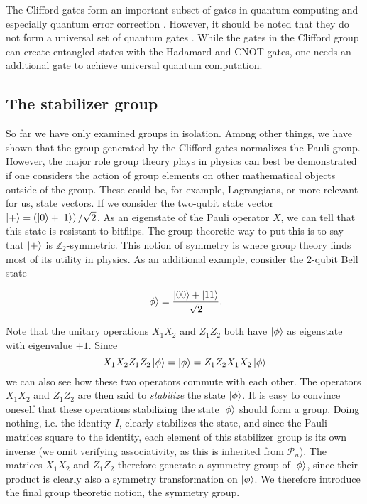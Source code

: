 The Clifford gates form an important subset of gates in quantum computing and
especially quantum error correction
\cite{calderbankQuantumErrorCorrection1997,calderbankGoodQuantumErrorcorrecting1996,steaneMultipleParticleInterferenceQuantum1996,bennettQuantumCryptographyPublic2020,bennettCommunicationOneTwoparticle1992}.
However, it should be noted that they do not form a universal set
of quantum gates . While the gates in the Clifford group can create entangled
states with the Hadamard and CNOT gates, one needs an additional gate to
achieve universal quantum computation.
\subsection{The stabilizer group}

So far we have only examined groups in isolation. Among other things, we have
shown that the group generated by the Clifford gates normalizes the Pauli
group.  However, the major role group theory plays in physics can best be
demonstrated if one considers the action of group elements on other
mathematical objects outside of the group. These could be, for example,
Lagrangians, or more relevant for us, state vectors. If we consider the
two-qubit state vector $\ket{+} = \left( \ket{0} + \ket{1} \right) / \sqrt{2}$.
As an eigenstate of the Pauli operator $X$, we can tell that this state is
resistant to bitflips.  The group-theoretic way to put this is to say that
$\ket{+}$ is $\mathbb{Z}_2$-symmetric. This notion of symmetry is where group
theory finds most of its utility in physics.  As an additional example,
consider the 2-qubit Bell state

\begin{align}
  \ket{\phi} = \frac{\ket{00} + \ket{11}}{\sqrt{2}} 
.\end{align}

Note that the unitary operations $X_1 X_2$ and $Z_1 Z_2$ both have $\ket{\phi}$
as eigenstate with eigenvalue $+1$. Since $$X_1X_2Z_1Z_2\ket{\phi} = \ket{\phi} =
Z_1Z_2X_1X_2\ket{\phi}$$ we can also see how these two operators commute with each
other. The operators $X_1X_2$ and $Z_1Z_2$ are then said to \emph{stabilize} the
state $\ket{\phi}$. It is easy to convince oneself that these operations
stabilizing the state $\ket{\phi}$ should form a group. Doing nothing, i.e. the
identity $I$, clearly stabilizes the state, and since the Pauli matrices square
to the identity, each element of this stabilizer group is its own inverse (we
omit verifying associativity, as this is inherited from $\mathcal{P}_n$). The
matrices $X_1X_2$ and $Z_1Z_2$ therefore generate a symmetry group of
$\ket{\phi}$, since their product is clearly also a symmetry transformation on
$\ket{\phi}$. We therefore introduce the final group theoretic notion, the
symmetry group.

